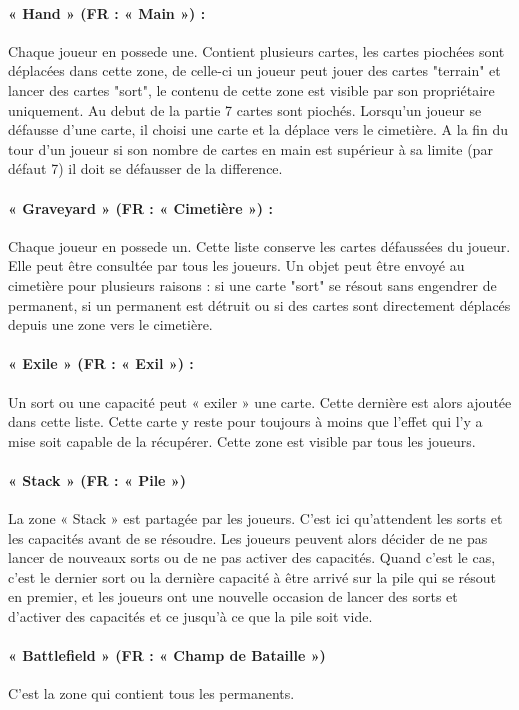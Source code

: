 \documentclass[a4paper,12pt]{article}
\begin{document}
\paragraph{« Hand » (FR : « Main »)  :}  Chaque joueur en possede une. Contient plusieurs cartes, les cartes piochées sont déplacées dans cette zone, de celle-ci un joueur peut jouer des cartes "terrain" et lancer des cartes "sort", le contenu de cette zone est visible par son propriétaire uniquement.
Au debut de la partie 7 cartes sont piochés.
Lorsqu'un joueur se défausse d'une carte, il choisi une carte et la déplace vers le cimetière.
A la fin du tour d'un joueur si son nombre de cartes en main est supérieur à sa limite (par défaut 7) il doit se défausser de la difference.

\paragraph{« Graveyard » (FR : « Cimetière ») :}  Chaque joueur en possede un. Cette liste conserve les cartes défaussées du joueur. Elle peut être consultée par tous les joueurs. Un objet peut être envoyé au cimetière pour plusieurs raisons : si une carte "sort" se résout sans engendrer de permanent, si un permanent est détruit ou si des cartes sont directement déplacés depuis une zone vers le cimetière.

\paragraph{« Exile » (FR : « Exil ») :} Un sort ou une capacité peut « exiler » une carte. Cette dernière est alors ajoutée dans cette liste. Cette carte y reste pour toujours à moins que l'effet qui l’y a mise soit capable de la récupérer. Cette zone est visible par tous les joueurs. 

\paragraph{« Stack » (FR : « Pile »)}
La zone « Stack » est partagée par les joueurs. C’est ici qu’attendent les sorts et les capacités avant de se résoudre. Les joueurs peuvent alors décider de ne pas lancer de nouveaux sorts ou de ne pas activer des capacités.
Quand c'est le cas, c'est le dernier sort ou la dernière capacité à être arrivé sur la pile qui se résout en premier, et les joueurs ont une nouvelle occasion de lancer des sorts et d'activer des capacités et ce jusqu'à ce que la pile soit vide.

\paragraph{« Battlefield » (FR : « Champ de Bataille »)}
C'est la zone qui contient tous les permanents.
\end{document}
